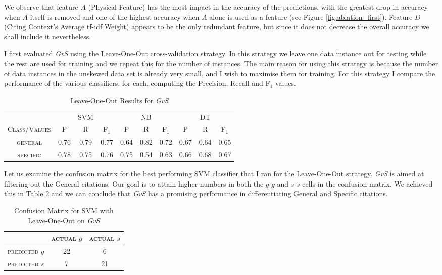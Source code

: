 We observe that feature $A$ (Physical Feature) has the most impact in the accuracy of the predictions, with the greatest drop in accuracy when $A$ itself is removed and one of the highest accuracy when $A$ alone is used as a feature (see Figure \ref{fig:ablation_first}). Feature $D$ (Citing Context's Average \url{tf-idf} Weight) appears to be the only redundant feature, but since it does not decrease the overall accuracy we shall include it nevertheless.

I first evaluated {\it GvS} using the \url{Leave-One-Out} cross-validation strategy. In this strategy we leave one data instance out for testing while the rest are used for training and we repeat this for the number of instances. The main reason for using this strategy is because the number of data instances in the unskewed data set is already very small, and I wish to maximise them for training. For this strategy I compare the performance of the various classifiers, for each, computing the Precision, Recall and F$_1$ values.

\begin{table}[h]
	\center
	\begin{tabular}{ c | c  c  c | c c c | c c c}
		& & SVM & & & NB & & & DT \\
		\textsc{Class/Values} & \textsc{P} & \textsc{R} & \textsc{F$_1$} & \textsc{P} & \textsc{R} & \textsc{F$_1$} & \textsc{P} & \textsc{R} & \textsc{F$_1$} \\
		\hline
		\textsc{general} 			& 0.76  &    0.79   &   0.77 & 0.64   &   0.82   &   0.72 & 0.67  &    0.64  &    0.65 \\
		\textsc{specific} 			& 0.78  &    0.75   &   0.76 & 0.75   &   0.54   &   0.63 & 0.66  &    0.68  &    0.67 \\
	\end{tabular}
	\caption{Leave-One-Out Results for {\it GvS}}
	\label{tab:firsttieresults}
\end{table}

Let us examine the confusion matrix for the best performing SVM classifier that I ran for the \url{Leave-One-Out} strategy. {\it GvS} is aimed at filtering out the General citations. Our goal is to attain higher numbers in both the $g$-$g$ and $s$-$s$ cells in the confusion matrix. We achieved this in Table \ref{tab:firstsvmconfusionmatrix} and we can conclude that {\it GvS} has a promising performance in differentiating General and Specific citations.

\begin{table}[h]
	\center
	\begin{tabular}{ c | c  c }
		 & \textsc{actual $g$} & \textsc{actual $s$} \\
		\hline
		\textsc{predicted $g$} 	& 22 & 6 \\
		\textsc{predicted $s$}		& 7 & 21
	\end{tabular}
	\caption{Confusion Matrix for SVM with Leave-One-Out on {\it GvS}}
	\label{tab:firstsvmconfusionmatrix}
\end{table}

